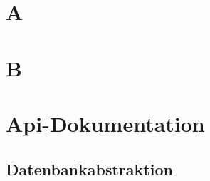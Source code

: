 \documentclass[8pt, a4paper, twocolumn]{scrreprt}
\begin{document}
\appendix
\chapter{A}
\chapter{B}
\chapter{Api-Dokumentation}

\section{Datenbankabstraktion}
















\end{document}
